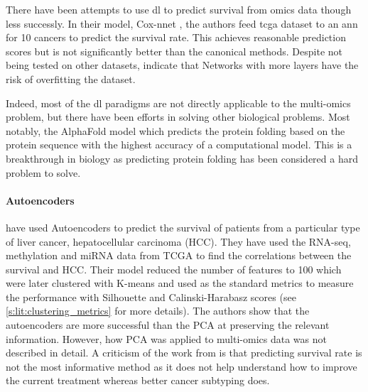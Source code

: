 There have been attempts to use \acrshort{dl} to predict survival from omics data though less successly. In their model, Cox-nnet \citep{Ching2018-gq}, the authors feed \acrshort{tcga} dataset to an \acrshort{ann} for 10 cancers to predict the survival rate. This achieves reasonable prediction scores but is not significantly better than the canonical methods. Despite not being tested on other datasets, \citet{Ching2018-gq} indicate that Networks with more layers have the risk of overfitting the dataset.  

Indeed, most of the \acrshort{dl} paradigms are not directly applicable to the multi-omics problem, but there have been efforts in solving other biological problems. Most notably, the AlphaFold model \citep{Jumper2021-du} which predicts the protein folding based on the protein sequence with the highest accuracy of a computational model. This is a breakthrough in biology as predicting protein folding has been considered a hard problem to solve.



\paragraph*{Autoencoders} \label{s:lit:autoencoders}

\citet{Chaudhary2018-qj} have used Autoencoders to predict the survival of patients from a particular type of liver cancer, hepatocellular carcinoma (HCC). They have used the RNA-seq, methylation and miRNA data from TCGA to find the correlations between the survival and HCC. Their model reduced the number of features to 100 which were later clustered with K-means and used as the standard metrics to measure the performance with Silhouette and Calinski-Harabasz scores (see \cref{s:lit:clustering_metrics} for more details). The authors show that the autoencoders are  more successful than the PCA at preserving the relevant information. However, how PCA was applied to multi-omics data was not described in detail. A criticism of the work from \citeauthor{Chaudhary2018-qj} is that predicting survival rate is not the most informative method as it does not help understand how to improve the current treatment whereas better cancer subtyping does.

